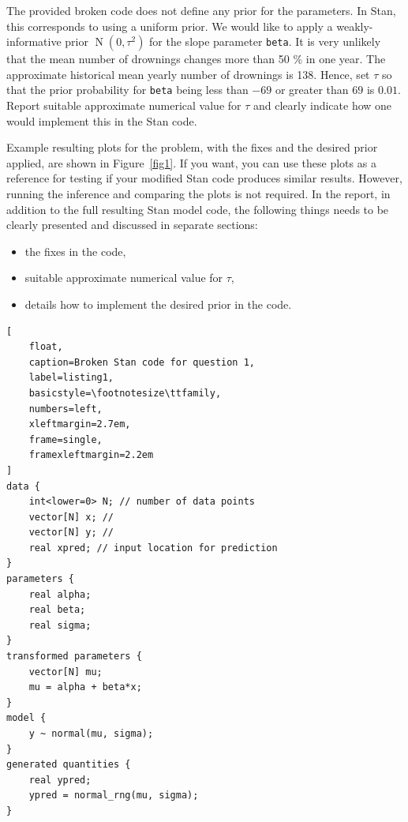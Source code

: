 \documentclass[a4paper,11pt]{article}
\begin{document}
The provided broken code does not define any prior for the parameters. In Stan, this corresponds to using a uniform prior. We would like to apply a weakly-informative prior $\operatorname{N}(0, \tau^2)$ for the slope parameter {\tt beta}. It is very unlikely that the mean number of drownings changes more than 50 \% in one year. The approximate historical mean yearly number of drownings is 138. Hence, set $\tau$ so that the prior probability for {\tt beta} being less than $-69$ or greater than $69$ is $0.01$. Report suitable approximate numerical value for $\tau$ and clearly indicate how one would implement this in the Stan code.

Example resulting plots for the problem, with the fixes and the desired prior applied, are shown in Figure~\ref{fig1}. If you want, you can use these plots as a reference for testing if your modified Stan code produces similar results. However, running the inference and comparing the plots is not required. In the report, in addition to the full resulting Stan model code, the following things needs to be clearly presented and discussed in separate sections:
\begin{itemize}
\item the fixes in the code,
\item suitable approximate numerical value for $\tau$,
\item details how to implement the desired prior in the code.
\end{itemize}

\begin{lstlisting}[
	float,
	caption=Broken Stan code for question 1,
	label=listing1,
	basicstyle=\footnotesize\ttfamily,
	numbers=left,
	xleftmargin=2.7em,
	frame=single,
	framexleftmargin=2.2em
]
data {
    int<lower=0> N; // number of data points
    vector[N] x; //
    vector[N] y; //
    real xpred; // input location for prediction
}
parameters {
    real alpha;
    real beta;
    real sigma;
}
transformed parameters {
    vector[N] mu;
    mu = alpha + beta*x;
}
model {
    y ~ normal(mu, sigma);
}
generated quantities {
    real ypred;
    ypred = normal_rng(mu, sigma);
}
\end{lstlisting}
\end{document}
